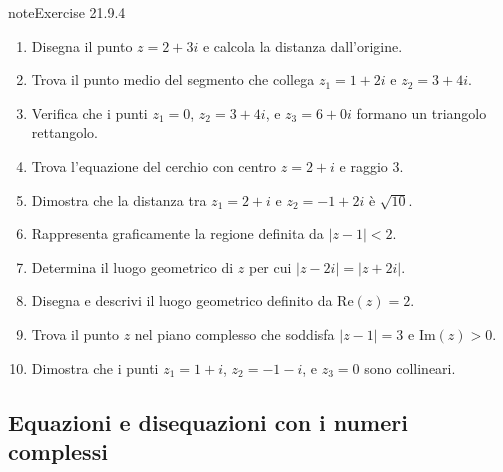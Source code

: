 \documentclass[letterpaper,10pt,italian]{jupyterBook}
\begin{document}
\begin{sphinxadmonition}{note}{Exercise 21.9.4}


\begin{enumerate}
%
\item {} 
\sphinxAtStartPar
Disegna il punto \(z = 2 + 3i\) e calcola la distanza dall’origine.

\item {} 
\sphinxAtStartPar
Trova il punto medio del segmento che collega \(z_1 = 1 + 2i\) e \(z_2 = 3 + 4i\).

\item {} 
\sphinxAtStartPar
Verifica che i punti \(z_1 = 0\), \(z_2 = 3 + 4i\), e \(z_3 = 6 + 0i\) formano un triangolo rettangolo.

\item {} 
\sphinxAtStartPar
Trova l’equazione del cerchio con centro \(z = 2 + i\) e raggio \(3\).

\item {} 
\sphinxAtStartPar
Dimostra che la distanza tra \(z_1 = 2 + i\) e \(z_2 = -1 + 2i\) è \(\sqrt{10}\).

\item {} 
\sphinxAtStartPar
Rappresenta graficamente la regione definita da \(|z - 1| < 2\).

\item {} 
\sphinxAtStartPar
Determina il luogo geometrico di \(z\) per cui \(|z - 2i| = |z + 2i|\).

\item {} 
\sphinxAtStartPar
Disegna e descrivi il luogo geometrico definito da \(\text{Re}(z) = 2\).

\item {} 
\sphinxAtStartPar
Trova il punto \(z\) nel piano complesso che soddisfa \(|z - 1| = 3\) e \(\text{Im}(z) > 0\).

\item {} 
\sphinxAtStartPar
Dimostra che i punti \(z_1 = 1 + i\), \(z_2 = -1 - i\), e \(z_3 = 0\) sono collineari.

\end{enumerate}
\end{sphinxadmonition}


\subsection{Equazioni e disequazioni con i numeri complessi}
\label{\detokenize{ch/algebra/complex-algebra-problems:equazioni-e-disequazioni-con-i-numeri-complessi}}\label{\detokenize{ch/algebra/complex-algebra-problems:math-hs-algebra-complex-problems-equations}}
\end{document}
